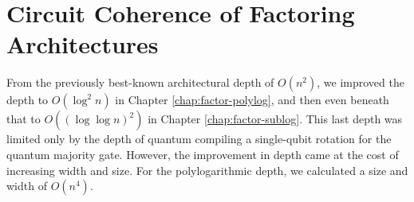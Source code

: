 \section{Circuit Coherence of Factoring Architectures}
\label{sec:cohere-factor}


From the previously best-known architectural depth of
$O(n^2)$, we improved the depth to $O(\log^2 n)$ in Chapter \ref{chap:factor-polylog},
and then even beneath that to $O((\log\log n)^2)$ in Chapter \ref{chap:factor-sublog}.
This last depth was limited only by the depth of quantum compiling a
single-qubit rotation for the quantum majority gate. However, the improvement
in depth came at the cost of increasing width and size.
For the polylogarithmic depth, we calculated a size and width of $O(n^4)$.

